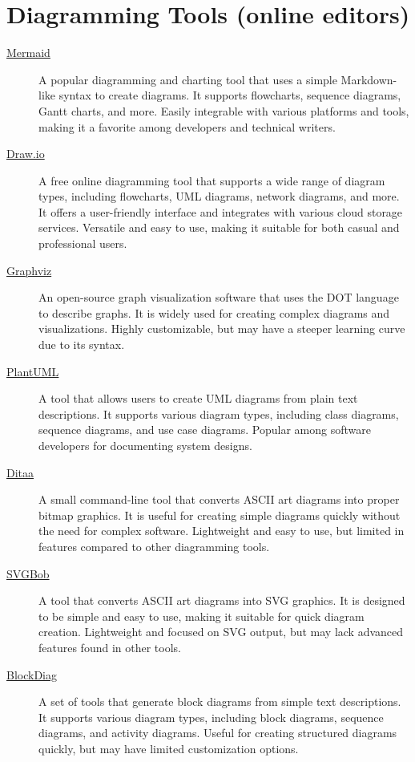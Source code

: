 \documentclass[a4paper,twoside]{article}
\begin{document}
\section{Diagramming Tools (online editors)}
\begin{description}
\item[{\href{https://mermaid-js.github.io/mermaid/\#/}{Mermaid}}] A popular diagramming and charting tool that uses a simple Markdown-like syntax to create diagrams. It supports flowcharts, sequence diagrams, Gantt charts, and more. Easily integrable with various platforms and tools, making it a favorite among developers and technical writers.
\item[{\href{https://app.diagrams.net/}{Draw.io}}] A free online diagramming tool that supports a wide range of diagram types, including flowcharts, UML diagrams, network diagrams, and more. It offers a user-friendly interface and integrates with various cloud storage services. Versatile and easy to use, making it suitable for both casual and professional users.
\item[{\href{https://graphviz.org/}{Graphviz}}] An open-source graph visualization software that uses the DOT language to describe graphs. It is widely used for creating complex diagrams and visualizations. Highly customizable, but may have a steeper learning curve due to its syntax.
\item[{\href{https://plantuml.com/}{PlantUML}}] A tool that allows users to create UML diagrams from plain text descriptions. It supports various diagram types, including class diagrams, sequence diagrams, and use case diagrams. Popular among software developers for documenting system designs.
\item[{\href{http://ditaa.sourceforge.net/}{Ditaa}}] A small command-line tool that converts ASCII art diagrams into proper bitmap graphics. It is useful for creating simple diagrams quickly without the need for complex software. Lightweight and easy to use, but limited in features compared to other diagramming tools.
\item[{\href{https://ivanceras.github.io/svgbob-editor/}{SVGBob}}] A tool that converts ASCII art diagrams into SVG graphics. It is designed to be simple and easy to use, making it suitable for quick diagram creation. Lightweight and focused on SVG output, but may lack advanced features found in other tools.
\item[{\href{http://blockdiag.com/en/blockdiag/index.html}{BlockDiag}}] A set of tools that generate block diagrams from simple text descriptions. It supports various diagram types, including block diagrams, sequence diagrams, and activity diagrams. Useful for creating structured diagrams quickly, but may have limited customization options.

\end{description}
\end{document}
